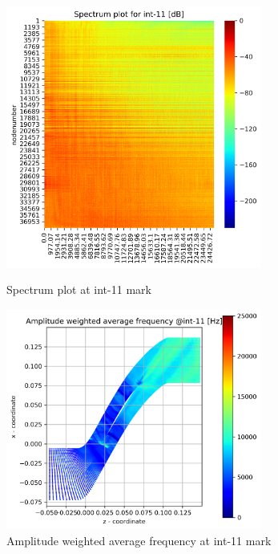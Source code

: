 \begin{figure}[ht]
  \centering
  \includegraphics[width=0.75\textwidth]{Figures/int-11_spectrum.png}
  \caption{Spectrum plot at int-11 mark} \label{int-11-spectrum}
  
  \vspace*{\floatsep}%

  \includegraphics[width=0.75\textwidth]{Figures/int-11-awaf.png}
  \caption{Amplitude weighted average frequency at int-11 mark} \label{int-11-awaf}
\end{figure}
